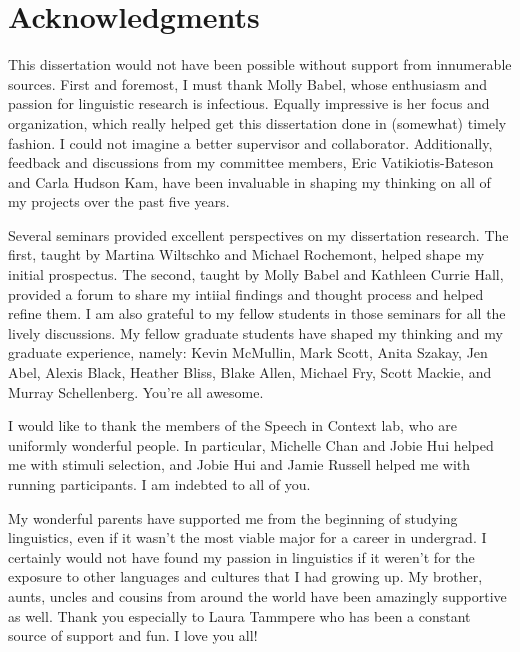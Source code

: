 
\chapter{Acknowledgments}

This dissertation would not have been possible without support from innumerable sources. 
First and foremost, I must thank Molly Babel, whose enthusiasm and passion for linguistic research is infectious.
Equally impressive is her focus and organization, which really helped get this dissertation done in (somewhat) timely fashion.
I could not imagine a better supervisor and collaborator.
Additionally, feedback and discussions from my committee members, Eric Vatikiotis-Bateson and Carla Hudson Kam, have been invaluable in shaping my thinking on all of my projects over the past five years.

Several seminars provided excellent perspectives on my dissertation research.
The first, taught by Martina Wiltschko and Michael Rochemont, helped shape my initial prospectus.
The second, taught by Molly Babel and Kathleen Currie Hall, provided a forum to share my intiial findings and thought process and helped refine them.
I am also grateful to my fellow students in those seminars for all the lively discussions.
My fellow graduate students have shaped my thinking and my graduate experience, namely: Kevin McMullin, Mark Scott, Anita Szakay, Jen Abel, Alexis Black, Heather Bliss, Blake Allen, Michael Fry, Scott Mackie, and Murray Schellenberg.  You're all awesome.

I would like to thank the members of the Speech in Context lab, who are uniformly wonderful people.  
In particular, Michelle Chan and Jobie Hui helped me with stimuli selection, and Jobie Hui and Jamie Russell helped me with running participants.
I am indebted to all of you.

My wonderful parents have supported me from the beginning of studying linguistics, even if it wasn't the most viable major for a career in undergrad.
I certainly would not have found my passion in linguistics if it weren't for the exposure to other languages and cultures that I had growing up.
My brother, aunts, uncles and cousins from around the world have been amazingly supportive as well.
Thank you especially to Laura Tammpere who has been a constant source of support and fun.
I love you all!